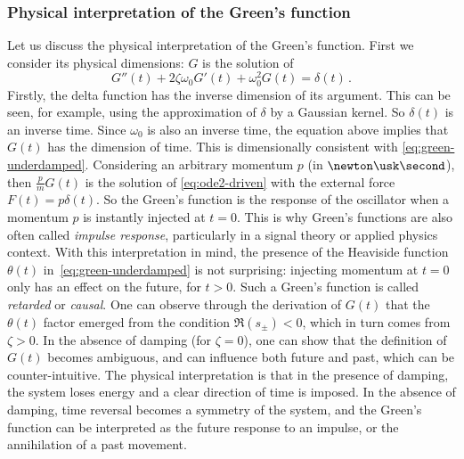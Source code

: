 \subsubsection{Physical interpretation of the Green's function}
Let us discuss the physical interpretation of the Green's function. First we consider its
physical dimensions: $G$ is the solution of
\begin{equation}
  G''(t)+2\zeta\omega_0 G'(t)+\omega_0^2G(t)=\delta(t)\,.
\end{equation}
Firstly, the delta function has the inverse dimension of its argument. This can be seen,
for example, using the approximation of $\delta$ by a Gaussian kernel. So $\delta(t)$ is
an inverse time. Since $\omega_0$ is also an inverse time, the equation above implies that
$G(t)$ has the dimension of time. This is dimensionally consistent with
\cref{eq:green-underdamped}. Considering an arbitrary momentum $p$ (in
$\newton\usk\second$), then $\frac{p}{m}G(t)$ is the solution of \cref{eq:ode2-driven}
with the external force $F(t)=p\delta(t)$. So the Green's function is the response of the
oscillator when a momentum $p$ is instantly injected at $t=0$. This is why Green's functions
are also often called \emph{impulse response}, particularly in a signal theory or applied
physics context. With this interpretation in mind, the presence of the Heaviside function
$\theta(t)$ in~\cref{eq:green-underdamped} is not surprising: injecting momentum at $t=0$
only has an effect on the future, \ie for $t>0$. Such a Green's function is called
\emph{retarded} or \emph{causal}. One can observe through the derivation of $G(t)$ that
the $\theta(t)$ factor emerged from the condition $\Re(s_{\pm})<0$, which in turn comes
from $\zeta>0$. In the absence of damping (\ie for $\zeta=0$), one can show that the
definition of $G(t)$ becomes ambiguous, and can influence both future and past, which can
be counter-intuitive. The physical interpretation is that in the presence of damping, the
system loses energy and a clear direction of time is imposed. In the absence of damping,
time reversal becomes a symmetry of the system, and the Green's function can be
interpreted as the future response to an impulse, or the annihilation of a past movement.

